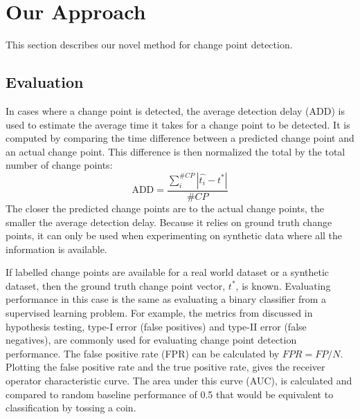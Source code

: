 
\section{Our Approach}

This section describes our novel method for change point detection.

\subsection{Evaluation}
In cases where a change point is detected, the average detection delay (ADD) is used to estimate the average time it takes for a change point to be detected. It is computed by comparing the time difference between a predicted change point and an actual change point. This difference is then normalized the total by the total number of change points:
\begin{equation}
\text{ADD} = \frac{\sum_i^{\#CP} |\hat{t_i} - t^*|}{\#CP}
\end{equation}
The closer the predicted change points are to the actual change points, the smaller the average detection delay. Because it relies on ground truth change points, it can only be used when experimenting on synthetic data where all the information is available.%

If labelled change points are available for a real world dataset or a synthetic dataset, then the ground truth change point vector, 
$t^*$, is known. Evaluating performance in this case is the same as evaluating a binary classifier from a supervised learning problem. For example, the metrics from discussed in hypothesis testing, type-I error (false positives) and type-II error (false negatives), are commonly used for evaluating change point detection performance. The false positive rate (FPR) can be calculated by $FPR = FP / N$. Plotting the false positive rate and the true positive rate, gives the receiver operator characteristic curve. The area under this curve (AUC), is calculated and compared to random baseline performance of 0.5 that would be equivalent to classification by tossing a coin.


